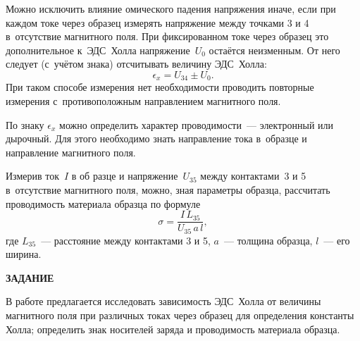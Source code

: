 Можно исключить влияние омического падения напряжения иначе, если при каждом токе через образец измерять напряжение
между точками 3 и 4 в~отсутствие магнитного поля. При фиксированном токе через образец это дополнительное к~ЭДС~Холла напряжение~$U_0$ остаётся неизменным. От него следует (с~учётом знака) отсчитывать величину ЭДС~Холла:
\begin{equation}
\epsilon_x=U_{34}\pm U_0.
\label{fig3.4.1}
\end{equation}
При таком способе измерения нет необходимости проводить повторные измерения с~противоположным направлением магнитного поля.

По знаку $\epsilon_x$ можно определить характер проводимости~--- электронный или дырочный. Для этого необходимо знать
направление тока в~образце и направление магнитного поля.

Измерив ток~$I$ в об
разце и напряжение~$U_{35}$ между контактами~3 и 5 в~отсутствие магнитного поля, можно, зная
параметры образца, рассчитать проводимость материала образца по формуле
\begin{equation}
\sigma=\frac{I\, L_{35}}{U_{35}\,a\,l},
\label{eq3.4.2}
\end{equation}
где $L_{35}$~--- расстояние между контактами 3 и 5, $a$~--- толщина образца, $l$~--- его ширина.

{\Large \bf ЗАДАНИЕ}

В работе предлагается исследовать зависимость ЭДС~Холла от величины магнитного поля при различных токах через образец для определения константы Холла; определить знак носителей заряда и проводимость материала образца.

